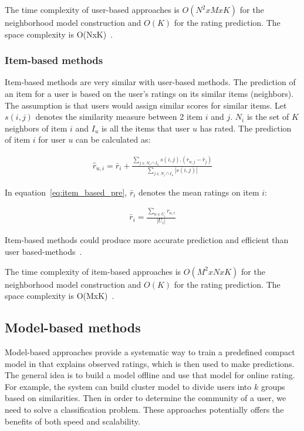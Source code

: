 \documentclass[oneside,13pt]{extreport}
\begin{document}
The time complexity of user-based approaches is $O(N^2xMxK)$ for the neighborhood model construction and $O(K)$ for the rating prediction. The  space complexity is O(NxK)~\cite{chevalier2009collaborative}.

\subsubsection{Item-based methods}
Item-based methods are very similar with user-based methods. The prediction of an item for a user is based on the user’s ratings on its similar items (neighbors). The assumption is that users would assign similar
scores for similar items. Let $s\left( {i,j} \right)$ denotes the similarity measure between 2 item $i$ and $j$. $N_i$ is the set of $K$ neighbors of item $i$ and $I_u$ is all the items that user $u$ has rated. The prediction of item $i$ for user $u$ can be calculated as:

\begin{eqnarray}
\label{eq:item_based_pre}
\hat r_{u,i} = \bar r_i+\frac{{\sum\limits_{j \in {N_i} \cap {I_u}} {{s\left( {i,j} \right)}.({r_{u,j}}-\bar r_j)} }}{{\sum\limits_{j \in {N_i} \cap {I_u}}  {\left| {s\left( {i,j} \right)} \right|} }}
\end{eqnarray}

In equation~\ref{eq:item_based_pre}, $\bar r_i$ denotes the mean ratings on item $i$:

\begin{eqnarray}
\label{eq:mean_rating_item}
\bar r_i = \frac{{\sum\nolimits_{u \in {U_i}} {{r_{u,i}}} }}{{\left| {{U_i}} \right|}}
\end{eqnarray}

Item-based methods could produce more accurate prediction and efficient than user based-methods~\cite{sarwar2001item}.

The time complexity of item-based approaches is $O(M^2xNxK)$ for the neighborhood model construction and $O(K)$ for the rating prediction. The  space complexity is O(MxK)~\cite{chevalier2009collaborative}.
\subsection{Model-based methods}
Model-based approaches provide a systematic way to train a predefined compact model in that explains observed ratings, which is then used to make predictions. The general idea is to build a model offline and use that model for online rating. For example, the system can build cluster model to divide users into $k$ groups based on similarities. Then in order to determine the community of a user, we need to solve a classification problem. These approaches potentially offers the benefits of both speed and scalability.
\end{document}
